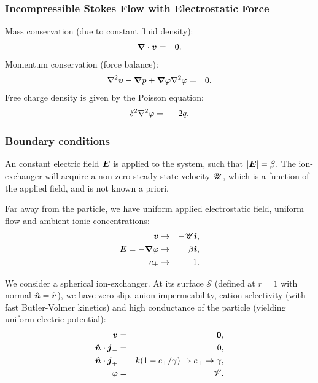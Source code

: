 \subsubsection{Incompressible Stokes Flow with Electrostatic Force}
Mass conservation (due to constant fluid density):
\begin{eqnarray}
\boldsymbol{\nabla} \cdot \boldsymbol{v} &=& 0.
\end{eqnarray}
Momentum conservation (force balance):
\begin{eqnarray}
\nabla^2 \boldsymbol{v} - \boldsymbol{\nabla} p + \boldsymbol{\nabla} \varphi \nabla^2 \varphi &=& 0.
\end{eqnarray}
Free charge density is given by the Poisson equation:
\begin{eqnarray}
\delta^2 \nabla^2 \varphi &=& -2q.
\end{eqnarray}

\subsubsection{Boundary conditions}
An constant electric field $\boldsymbol{E}$ is applied to the system, such that $|\boldsymbol{E}| = \beta$.
The ion-exchanger will acquire a non-zero steady-state velocity $\mathscr{U}$, which is
a function of the applied field, and is not known a priori.

Far away from the particle, we have uniform applied electrostatic field, uniform flow 
and ambient ionic concentrations:
\begin{eqnarray}
\boldsymbol{v} &\rightarrow& -\mathscr{U} \boldsymbol{\hat{\imath}}, \\
\boldsymbol{E} = -\boldsymbol{\nabla} \varphi &\rightarrow& \beta\boldsymbol{\hat{\imath}}, \\
c_\pm &\rightarrow& 1.
\end{eqnarray}

We consider a spherical ion-exchanger. 
At its surface $\mathcal{S}$ (defined at $r=1$ with normal $\boldsymbol{\hat{n}} = \hat{\boldsymbol{r}}$), 
we have zero slip, anion impermeability, cation selectivity (with fast Butler-Volmer kinetics)
and high conductance of the particle (yielding uniform electric potential):
\begin{eqnarray}
\boldsymbol{v} & = & \boldsymbol{0}, \\
\boldsymbol{\hat{n}} \cdot \boldsymbol{j}_- & = & 0, \\
\boldsymbol{\hat{n}} \cdot \boldsymbol{j}_+ & = & k (1 - c_+/\gamma) \Rightarrow c_+ \rightarrow \gamma, \\
\varphi & = & \mathscr{V}.
\end{eqnarray}

